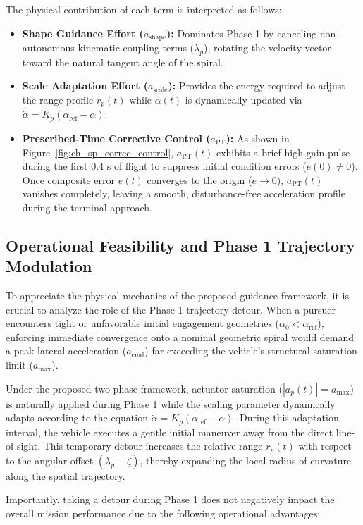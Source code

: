 The physical contribution of each term is interpreted as follows:
\begin{itemize}
    \item \textbf{Shape Guidance Effort ($a_{\text{shape}}$):} Dominates Phase 1 by canceling non-autonomous kinematic coupling terms ($\dot{\lambda}_p$), rotating the velocity vector toward the natural tangent angle of the spiral.
    \item \textbf{Scale Adaptation Effort ($a_{\text{scale}}$):} Provides the energy required to adjust the range profile $r_p(t)$ while $\alpha(t)$ is dynamically updated via $\dot{\alpha} = K_p(\alpha_{\text{ref}} - \alpha)$.
    \item \textbf{Prescribed-Time Corrective Control ($a_{\text{PT}}$):} As shown in Figure~\ref{fig:ch_sp_correc_control}, $a_{\text{PT}}(t)$ exhibits a brief high-gain pulse during the first $0.4\text{ s}$ of flight to suppress initial condition errors ($e(0) \neq 0$). Once composite error $e(t)$ converges to the origin ($e \to 0$), $a_{\text{PT}}(t)$ vanishes completely, leaving a smooth, disturbance-free acceleration profile during the terminal approach.
\end{itemize}
\subsection{Operational Feasibility and Phase 1 Trajectory Modulation}

To appreciate the physical mechanics of the proposed guidance framework, it is crucial to analyze the role of the Phase 1 trajectory detour. When a pursuer encounters tight or unfavorable initial engagement geometries ($\alpha_0 < \alpha_{\text{ref}}$), enforcing immediate convergence onto a nominal geometric spiral would demand a peak lateral acceleration ($a_{\text{cmd}}$) far exceeding the vehicle's structural saturation limit ($a_{\text{max}}$).

Under the proposed two-phase framework, actuator saturation ($|a_p(t)| = a_{\text{max}}$) is naturally applied during Phase 1 while the scaling parameter dynamically adapts according to the equation $\dot{\alpha} = K_p(\alpha_{\text{ref}} - \alpha)$. During this adaptation interval, the vehicle executes a gentle initial maneuver away from the direct line-of-sight. This temporary detour increases the relative range $r_p(t)$ with respect to the angular offset $(\lambda_p - \zeta)$, thereby expanding the local radius of curvature along the spatial trajectory.

Importantly, taking a detour during Phase 1 does not negatively impact the overall mission performance due to the following operational advantages:

